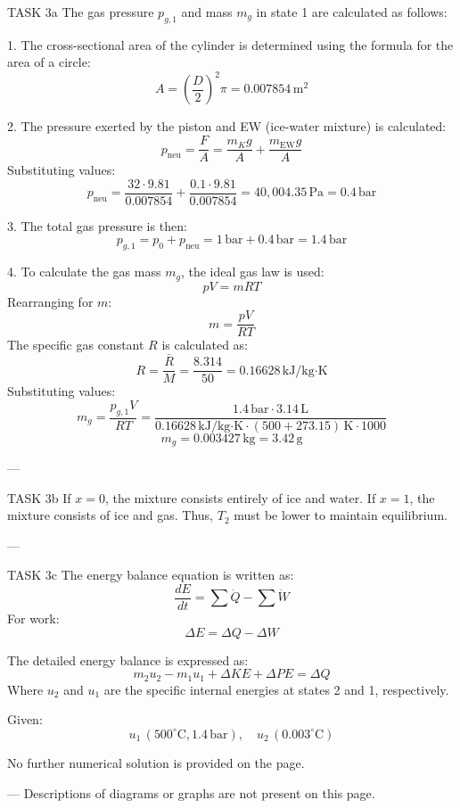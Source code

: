 TASK 3a  
The gas pressure \( p_{g,1} \) and mass \( m_g \) in state 1 are calculated as follows:

1. The cross-sectional area of the cylinder is determined using the formula for the area of a circle:  
\[
A = \left( \frac{D}{2} \right)^2 \pi = 0.007854 \, \text{m}^2
\]

2. The pressure exerted by the piston and EW (ice-water mixture) is calculated:  
\[
p_{\text{neu}} = \frac{F}{A} = \frac{m_K g}{A} + \frac{m_{\text{EW}} g}{A}
\]  
Substituting values:  
\[
p_{\text{neu}} = \frac{32 \cdot 9.81}{0.007854} + \frac{0.1 \cdot 9.81}{0.007854} = 40,004.35 \, \text{Pa} = 0.4 \, \text{bar}
\]

3. The total gas pressure is then:  
\[
p_{g,1} = p_0 + p_{\text{neu}} = 1 \, \text{bar} + 0.4 \, \text{bar} = 1.4 \, \text{bar}
\]

4. To calculate the gas mass \( m_g \), the ideal gas law is used:  
\[
p V = m R T
\]  
Rearranging for \( m \):  
\[
m = \frac{p V}{R T}
\]  
The specific gas constant \( R \) is calculated as:  
\[
R = \frac{\bar{R}}{M} = \frac{8.314}{50} = 0.16628 \, \text{kJ/kg·K}
\]  
Substituting values:  
\[
m_g = \frac{p_{g,1} V}{R T} = \frac{1.4 \, \text{bar} \cdot 3.14 \, \text{L}}{0.16628 \, \text{kJ/kg·K} \cdot (500 + 273.15) \, \text{K} \cdot 1000}
\]  
\[
m_g = 0.003427 \, \text{kg} = 3.42 \, \text{g}
\]

---

TASK 3b  
If \( x = 0 \), the mixture consists entirely of ice and water.  
If \( x = 1 \), the mixture consists of ice and gas.  
Thus, \( T_2 \) must be lower to maintain equilibrium.

---

TASK 3c  
The energy balance equation is written as:  
\[
\frac{dE}{dt} = \sum \dot{Q} - \sum \dot{W}
\]  
For work:  
\[
\Delta E = \Delta Q - \Delta W
\]  

The detailed energy balance is expressed as:  
\[
m_2 u_2 - m_1 u_1 + \Delta KE + \Delta PE = \Delta Q
\]  
Where \( u_2 \) and \( u_1 \) are the specific internal energies at states 2 and 1, respectively.  

Given:  
\[
u_1 \, (500^\circ\text{C}, 1.4 \, \text{bar}), \quad u_2 \, (0.003^\circ\text{C})
\]  

No further numerical solution is provided on the page.  

---  
Descriptions of diagrams or graphs are not present on this page.